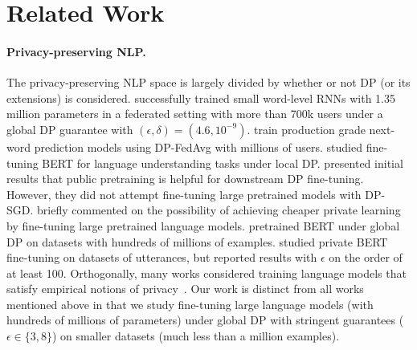 \section{Related Work}

\paragraph{Privacy-preserving NLP.}
The privacy-preserving NLP space is largely divided by whether or not DP (or its extensions) is considered.
\cite{mcmahan2017learning} successfully trained small word-level RNNs with 1.35 million parameters in a federated setting with more than 700k users under a global DP guarantee with $(\epsilon, \delta) = (4.6, 10^{-9})$.
\cite{ramaswamy2020training} train production grade next-word prediction models using DP-FedAvg with millions of users.
\cite{qu2021privacy} studied fine-tuning BERT for language understanding tasks under local DP. 
\cite{kerrigan2020differentially} presented initial results that public pretraining is helpful for downstream DP fine-tuning.
However, they did not attempt fine-tuning large pretrained models with DP-SGD.
\cite{bommasani2021opportunities} briefly commented on the possibility of achieving cheaper private learning by fine-tuning large pretrained language models. 
\cite{anil2021large} pretrained BERT under global DP on datasets with hundreds of millions of examples. 
\cite{dupuy2021efficient} studied private BERT fine-tuning on datasets of utterances, but reported results with $\epsilon$ on the order of at least 100. 
Orthogonally, many works considered training language models that satisfy empirical notions of privacy~\citep{xu2021utilitarian,coavoux2018privacy,mireshghallah2021privacy,melamud2019towards}.
Our work is distinct from all works mentioned above in that we study fine-tuning large language models (with hundreds of millions of parameters) under global DP with stringent guarantees ($\epsilon \in \{3, 8\}$) on smaller datasets (much less than a million examples).

